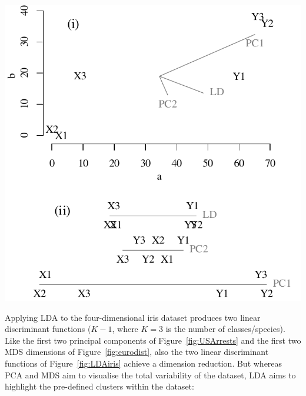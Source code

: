 \noindent\begin{minipage}[t][][b]{.55\textwidth}
  \noindent\includegraphics[width=\linewidth]{../figures/PCAvsLDA.pdf}\\
\end{minipage}
\begin{minipage}[t][][t]{.45\textwidth}
  \label{fig:PCAvsLDA}
\end{minipage}
  
Applying LDA to the four-dimensional iris dataset produces two linear
discriminant functions ($K-1$, where $K=3$ is the number of
classes/species).  Like the first two principal components of
Figure~\ref{fig:USArrests} and the first two MDS dimensions of
Figure~\ref{fig:eurodist}, also the two linear discriminant functions
of Figure~\ref{fig:LDAiris} achieve a dimension reduction. But whereas
PCA and MDS aim to visualise the total variability of the dataset, LDA
aims to highlight the pre-defined clusters within the dataset:

